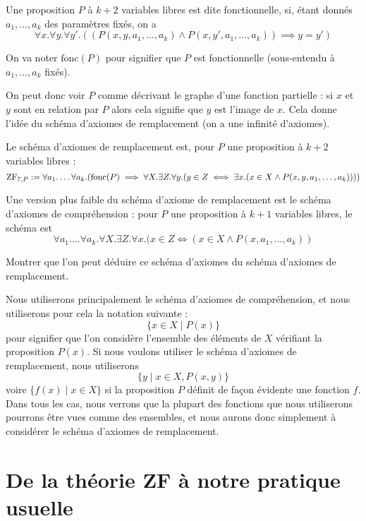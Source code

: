 \begin{defi}
    Une proposition $P$ à $k+2$ variables libres est dite fonctionnelle, si, étant donnés $a_1,\ldots,a_k$ des paramètres fixés, on a $$\forall x.\forall y.\forall y'. ((P(x,y,a_1,\ldots,a_k)\land P(x,y',a_1,\ldots,a_k))\implies y=y')$$

    On va noter $\mathrm{fonc}(P)$ pour signifier que $P$ est fonctionnelle (sous-entendu à $a_1,\ldots,a_k$ fixés).
\end{defi}

On peut donc voir $P$ comme décrivant le graphe d'une fonction partielle : si $x$ et $y$ sont en relation par $P$ alors cela signifie que $y$ est l'image de $x$. Cela donne l'idée du schéma d'axiomes de remplacement (on a une infinité d'axiomes).

\begin{ax}[Remplacement]
    Le schéma d'axiomes de remplacement est, pour $P$ une proposition à $k+2$ variables libres : $$\mathrm{ZF}_{7,P} := \forall a_1.\ldots\forall a_k.(\mathrm{fonc}(P)\implies \forall X.\exists Z. \forall y. (y\in Z \iff \exists x.(x\in X \land P(x,y,a_1,\ldots,a_k))))$$
\end{ax}

\begin{exo}
    Une version plus faible du schéma d'axiome de remplacement est le schéma d'axiomes de compréhension : pour $P$ une proposition à $k+1$ variables libres, le schéma est $$\forall a_1.\ldots\forall a_k.\forall X. \exists Z. \forall x. (x\in Z \iff (x\in X\land P(x,a_1,\ldots,a_k))$$

    Montrer que l'on peut déduire ce schéma d'axiomes du schéma d'axiomes de remplacement.
\end{exo}

Nous utiliserons principalement le schéma d'axiomes de compréhension, et nous utiliserons pour cela la notation suivante : $$\{ x\in X\mid P(x)\}$$ pour signifier que l'on considère l'ensemble des éléments de $X$ vérifiant la proposition $P(x)$. Si nous voulons utiliser le schéma d'axiomes de remplacement, nous utiliserons $$\{y \mid x\in X, P(x,y)\}$$ voire $\{f(x)\mid x \in X\}$ si la proposition $P$ définit de façon évidente une fonction $f$. Dans tous les cas, nous verrons que la plupart des fonctions que nous utiliserons pourrons être vues comme des ensembles, et nous aurons donc simplement à considérer le schéma d'axiomes de remplacement.

\section{De la théorie ZF à notre pratique usuelle}

